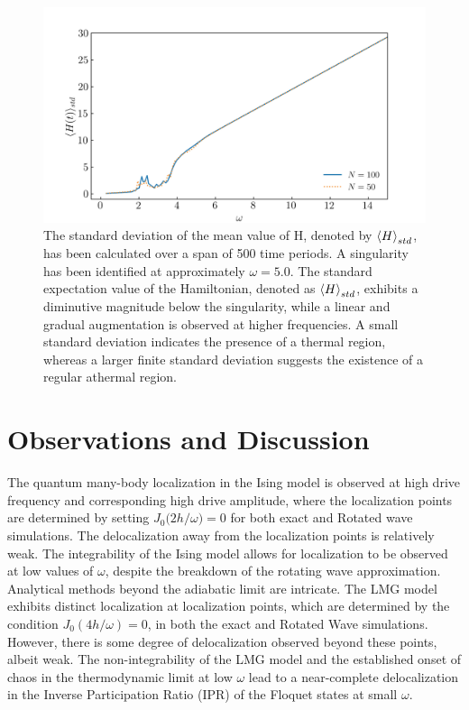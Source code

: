 \documentclass[%
reprint,
superscriptaddress,
amsmath,amssymb,
aps,
prb,
showkeys,
]{revtex4-2}
\begin{document}
	\begin{figure}[!ht]
		\centering
		\includegraphics[width = 9.cm]{hbar_avg_std.jpg}
		\caption{The standard deviation of the mean value of H, denoted by $\expval{H}_{std}$, has been calculated over a span of 500 time periods. A singularity has been identified at approximately $\omega = 5.0$. The standard expectation value of the Hamiltonian, denoted as $\expval{H}_{std}$, exhibits a diminutive magnitude below the singularity, while a linear and gradual augmentation is observed at higher frequencies. A small standard deviation indicates the presence of a thermal region, whereas a larger finite standard deviation suggests the existence of a regular athermal region.}
		\label{fig:havg_std}
	\end{figure}
	
	
	\section{\label{sec:level6}Observations and Discussion}
	
	The quantum many-body localization in the Ising model is observed at high drive frequency and corresponding high drive amplitude, where the localization points are determined by setting $J_0(2h/{\omega}\big)=0$ for both exact and Rotated wave simulations. The delocalization away from the localization points is relatively weak. The integrability of the Ising model allows for localization to be observed at low values of $\omega$, despite the breakdown of the rotating wave approximation. Analytical methods beyond the adiabatic limit are intricate. The LMG model exhibits distinct localization at localization points, which are determined by the condition $J_0(4h/\omega)=0$, in both the exact and Rotated Wave simulations. However, there is some degree of delocalization observed beyond these points, albeit weak. The non-integrability of the LMG model and the established onset of chaos in the thermodynamic limit at low $\omega$ lead to a near-complete delocalization in the Inverse Participation Ratio (IPR) of the Floquet states at small $\omega$. 
	
\end{document}
